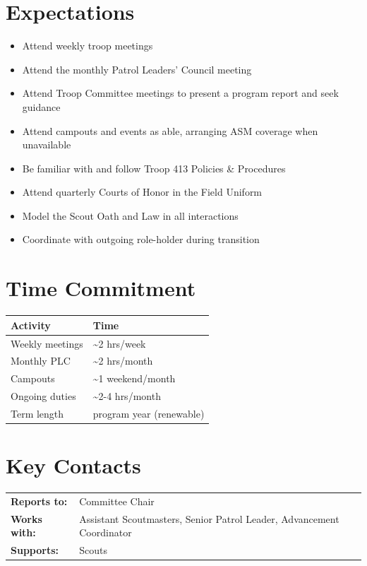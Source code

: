 \documentclass[11pt, letterpaper]{article}
\begin{document}
\begin{minipage}[t]{0.48\linewidth}
\raggedright

\section{Expectations}
\begin{itemize}
  \item Attend weekly troop meetings
  \item Attend the monthly Patrol Leaders' Council meeting
  \item Attend Troop Committee meetings to present a program report and seek guidance
  \item Attend campouts and events as able, arranging ASM coverage when unavailable
  \item Be familiar with and follow Troop 413 Policies \& Procedures
  \item Attend quarterly Courts of Honor in the Field Uniform
  \item Model the Scout Oath and Law in all interactions
  \item Coordinate with outgoing role-holder during transition
\end{itemize}

\section{Time Commitment}
\begin{tabular}{@{}p{3.0cm} >{\raggedright\arraybackslash}p{3.8cm}@{}}
  \toprule
  \textbf{Activity} & \textbf{Time} \\
  \midrule
  Weekly meetings   & \textasciitilde{}2 hrs/week \\
  Monthly PLC       & \textasciitilde{}2 hrs/month \\
  Campouts          & \textasciitilde{}1 weekend/month \\
  Ongoing duties    & \textasciitilde{}2-4 hrs/month \\
  Term length       & 1 program year (renewable) \\
  \bottomrule
\end{tabular}

\vspace{1em}

\section{Key Contacts}
\begin{tabular}{@{}p{2.2cm} >{\raggedright\arraybackslash}p{4.6cm}@{}}
  \textbf{Reports to:}  & Committee Chair \\
  \textbf{Works with:}  & Assistant Scoutmasters, Senior Patrol Leader, Advancement Coordinator \\
  \textbf{Supports:}    & Scouts \\
\end{tabular}

\end{minipage}
\end{document}
